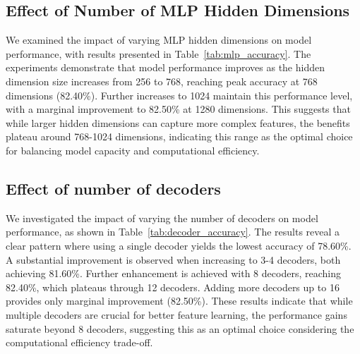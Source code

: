 \subsection{Effect of Number of MLP Hidden Dimensions}

We examined the impact of varying MLP hidden dimensions on model performance, with results presented in Table~\ref{tab:mlp_accuracy}. The experiments demonstrate that model performance improves as the hidden dimension size increases from 256 to 768, reaching peak accuracy at 768 dimensions (82.40\%). Further increases to 1024 maintain this performance level, with a marginal improvement to 82.50\% at 1280 dimensions. This suggests that while larger hidden dimensions can capture more complex features, the benefits plateau around 768-1024 dimensions, indicating this range as the optimal choice for balancing model capacity and computational efficiency.

\begin{table}[htbp]
    \centering
    \caption{Accuracy results for different MLP sizes}
    \label{tab:mlp_accuracy}
\end{table}

\subsection{Effect of number of decoders}

We investigated the impact of varying the number of decoders on model performance, as shown in Table~\ref{tab:decoder_accuracy}. The results reveal a clear pattern where using a single decoder yields the lowest accuracy of 78.60\%. A substantial improvement is observed when increasing to 3-4 decoders, both achieving 81.60\%. Further enhancement is achieved with 8 decoders, reaching 82.40\%, which plateaus through 12 decoders. Adding more decoders up to 16 provides only marginal improvement (82.50\%). These results indicate that while multiple decoders are crucial for better feature learning, the performance gains saturate beyond 8 decoders, suggesting this as an optimal choice considering the computational efficiency trade-off.

\begin{table}[htbp]
    \centering
    \caption{Accuracy results for different decoder sizes}
    \label{tab:decoder_accuracy}
\end{table}